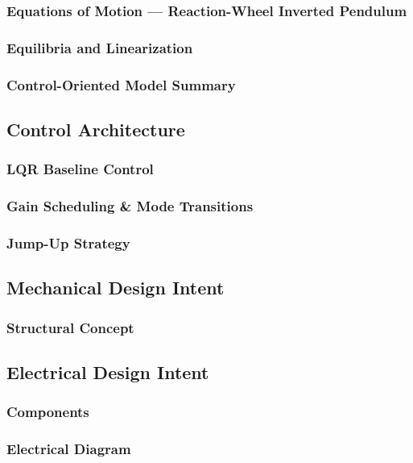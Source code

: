 \subsubsection{Equations of Motion --- Reaction-Wheel Inverted Pendulum}

\subsubsection{Equilibria and Linearization}

\subsubsection{Control-Oriented Model Summary}

\subsection{Control Architecture}

\subsubsection{LQR Baseline Control}

\subsubsection{Gain Scheduling \& Mode Transitions}

\subsubsection{Jump-Up Strategy}

\subsection{Mechanical Design Intent}

\subsubsection{Structural Concept}

\subsection{Electrical Design Intent}

\subsubsection{Components}

\subsubsection{Electrical Diagram}
